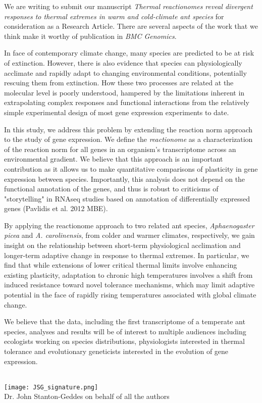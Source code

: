 \documentclass[letterpaper]{article}
\begin{document}
\thispagestyle{first}


We are writing to submit our manuscript \emph{Thermal
reactionomes reveal divergent responses to thermal extremes in warm and
cold-climate ant species} for consideration as a Research Article. There are
several aspects of the work that we think make it worthy of publication
in \emph{BMC Genomics}.

In face of contemporary climate change, many species are predicted to be at 
risk of extinction. However, there is also evidence that species can physiologically
acclimate and rapidly adapt to changing environmental conditions, potentially
rescuing them from extinction. How these two processes are related at the molecular
level is poorly understood, hampered by the limitations inherent in extrapolating 
complex responses and functional interactions from the relatively simple experimental
design of most gene expression experiments to date. 

In this study, we address this problem by extending the reaction
norm approach to the study of gene expression. We define the
\emph{reactionome} as a characterization of the reaction norm for all
genes in an organism's transcriptome across an environmental gradient. 
We believe that this approach is an important contribution as it allows us
to make quantitative comparisons of plasticity in gene expression between
species. Importantly, this analysis does not depend on the functional 
annotation of the genes, and thus is robust to criticisms of "storytelling" 
in RNAseq studies based on annotation of differentially expressed 
genes (Pavlidis et al. 2012 MBE). 

By applying the reactionome approach to two related ant species,
\emph{Aphaenogaster picea} and \emph{A. carolinensis}, from colder and
warmer climates, respectively, we gain insight on the relationship
between short-term physiological acclimation and longer-term adaptive
change in response to thermal extremes. In particular, we find that while
extensions of lower critical thermal limits involve enhancing existing plasticity,
adaptation to chronic high temperatures involves a shift from induced resistance
toward novel tolerance mechanisms, which may limit adaptive potential 
in the face of rapidly rising temperatures associated with global climate change.

We believe that the data, including the first transcriptome of a
temperate ant species, analyses and results will be of interest to
multiple audiences including ecologists working on species
distributions, physiologists interested in thermal tolerance and
evolutionary geneticists interested in the evolution of gene expression.


 \\
\texttt{[image: JSG\_signature.png]}  \\
Dr. John Stanton-Geddes on behalf of all the authors
\end{document}
